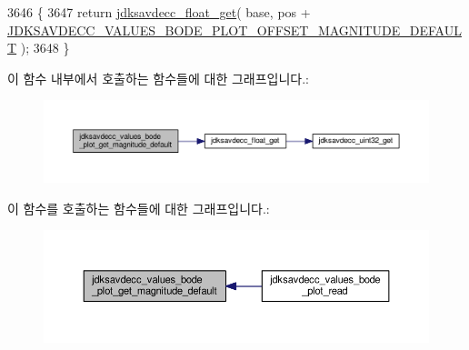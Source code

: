 \begin{DoxyCode}
3646 \{
3647     \textcolor{keywordflow}{return} \hyperlink{group__endian_gadf6108d4d5f2936dd5018e4b80265c8c}{jdksavdecc\_float\_get}( base, pos + 
      \hyperlink{group__values__bode__plot_ga071fe0b87c20377a42ea5bdf53ec2e35}{JDKSAVDECC\_VALUES\_BODE\_PLOT\_OFFSET\_MAGNITUDE\_DEFAULT} );
3648 \}
\end{DoxyCode}


이 함수 내부에서 호출하는 함수들에 대한 그래프입니다.\+:
\nopagebreak
\begin{figure}[H]
\begin{center}
\leavevmode
\includegraphics[width=350pt]{group__values__bode__plot_gac495e0f41eac0af578ed2521774fb1e9_cgraph}
\end{center}
\end{figure}




이 함수를 호출하는 함수들에 대한 그래프입니다.\+:
\nopagebreak
\begin{figure}[H]
\begin{center}
\leavevmode
\includegraphics[width=350pt]{group__values__bode__plot_gac495e0f41eac0af578ed2521774fb1e9_icgraph}
\end{center}
\end{figure}


